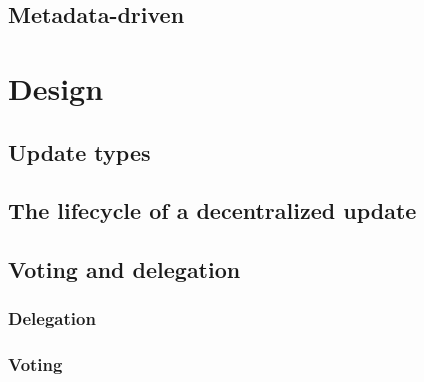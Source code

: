 \documentclass[11pt,a4paper]{article}
\begin{document}
\subsection{Metadata-driven}
\label{sec:metadata-driven}

\section{Design}
\label{sec:design}


\subsection{Update types}
\label{sec:update-types}



\subsection{The lifecycle of a decentralized update}
\label{sec:phases-an-update}


\subsection{Voting and delegation}
\label{sec:voting-delegation}

\subsubsection{Delegation}
\label{sec:delegation}


\subsubsection{Voting}
\label{sec:voting}
\end{document}
